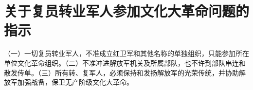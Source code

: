 \section[关于复员转业军人参加文化大革命问题的指示（一九六六年十二月）]{关于复员转业军人参加文化大革命问题的指示}


（一）一切复员转业军人，不准成立红卫军和其他名称的单独组织，只能参加所在单位文化革命组织。（二）不准冲进解放军机关及所属部队，也不许到部队串连和散发传单。（三）所有转、复军人，必须保持和发扬解放军的光荣传统，并协助解放军加强战备，保卫无产阶级文化大革命。


